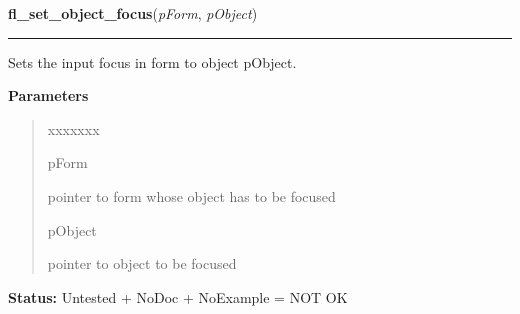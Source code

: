 \hspace{.8\funcindent}\begin{boxedminipage}{\funcwidth}

    \raggedright \textbf{fl\_set\_object\_focus}(\textit{pForm}, \textit{pObject})

    \vspace{-1.5ex}

    \rule{\textwidth}{0.5\fboxrule}
\setlength{\parskip}{2ex}
    Sets the input focus in form to object pObject.

\setlength{\parskip}{1ex}
      \textbf{Parameters}
      \vspace{-1ex}

      \begin{quote}
        \begin{Ventry}{xxxxxxx}

          \item[pForm]

          pointer to form whose object has to be focused

          \item[pObject]

          pointer to object to be focused

        \end{Ventry}

      \end{quote}

\textbf{Status:} Untested + NoDoc + NoExample = NOT OK



    \end{boxedminipage}

    \label{xformslib:library:fl_get_focus_object}

    \vspace{0.5ex}

